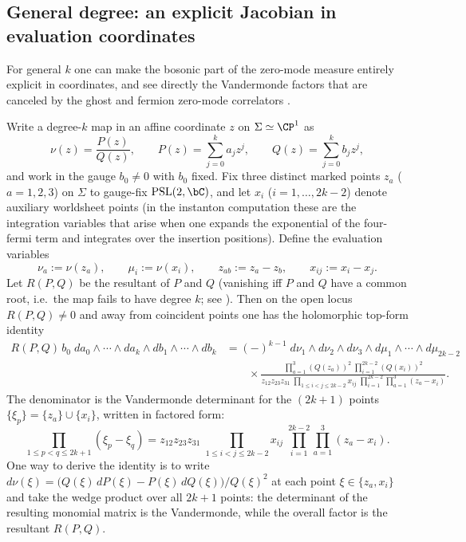 \documentclass[12pt]{article}
\begin{document}
\subsection{General degree: an explicit Jacobian in evaluation coordinates}
For general $k$ one can make the bosonic part of the zero-mode measure entirely
explicit in coordinates, and see directly the Vandermonde factors that are
canceled by the ghost and fermion zero-mode correlators
\cite{AspinwallMorrison:1991tft,Distler:1992n2}.

Write a degree-$k$ map in an affine coordinate $z$ on $\Sigma\simeq\CP^1$ as
\begin{equation*}
  \nu(z)=\frac{P(z)}{Q(z)},\qquad
  P(z)=\sum_{j=0}^k a_j z^j,\qquad
  Q(z)=\sum_{j=0}^k b_j z^j,
\end{equation*}
and work in the gauge $b_0\neq 0$ with $b_0$ fixed. Fix three distinct marked
points $z_a$ ($a=1,2,3$) on $\Sigma$ to gauge-fix $\mathrm{PSL}(2,\bC)$, and let
$x_i$ ($i=1,\dots,2k-2$) denote auxiliary worldsheet points (in the instanton
computation these are the integration variables that arise when one expands the
exponential of the four-fermi term and integrates over the insertion
positions). Define the evaluation variables
\begin{equation*}
  \nu_a:=\nu(z_a),\qquad \mu_i:=\nu(x_i),\qquad
  z_{ab}:=z_a-z_b,\qquad x_{ij}:=x_i-x_j.
\end{equation*}
Let $R(P,Q)$ be the resultant of $P$ and $Q$ (vanishing iff $P$ and $Q$ have a
common root, i.e.\ the map fails to have degree $k$; see
\cite[Eq.~(19.186)]{Yin:FoundationsStringTheory}). Then on the open locus
$R(P,Q)\neq 0$ and away from coincident points one has the holomorphic top-form
identity \cite[Eq.~(19.207)]{Yin:FoundationsStringTheory}
\begin{equation}
  \begin{aligned}
    R(P,Q)\,b_0\; da_0\wedge\cdots\wedge da_k\wedge db_1\wedge\cdots\wedge db_k
    &=
    (-)^{k-1}\; d\nu_1\wedge d\nu_2\wedge d\nu_3\wedge d\mu_1\wedge\cdots\wedge d\mu_{2k-2}\\
    &\qquad\times
    \frac{\prod_{a=1}^3 (Q(z_a))^2\;\prod_{i=1}^{2k-2} (Q(x_i))^2}{
      z_{12}z_{23}z_{31}\;
      \prod_{1\le i<j\le 2k-2} x_{ij}\;
      \prod_{i=1}^{2k-2}\prod_{a=1}^3 (z_a-x_i)}.
  \end{aligned}
  \label{eq:jacobian-general}
\end{equation}
The denominator is the Vandermonde determinant for the $(2k+1)$ points
$\{\xi_p\}=\{z_a\}\cup\{x_i\}$, written in factored form:
\begin{equation*}
  \prod_{1\le p<q\le 2k+1}(\xi_p-\xi_q)
  =
  z_{12}z_{23}z_{31}\;
  \prod_{1\le i<j\le 2k-2} x_{ij}\;
  \prod_{i=1}^{2k-2}\prod_{a=1}^3 (z_a-x_i).
\end{equation*}
One way to derive the identity is to write
$d\nu(\xi)=\big(Q(\xi)\,dP(\xi)-P(\xi)\,dQ(\xi)\big)/Q(\xi)^2$ at each point
$\xi\in\{z_a,x_i\}$ and take the wedge product over all $2k+1$ points: the
determinant of the resulting monomial matrix is the Vandermonde, while the
overall factor is the resultant $R(P,Q)$.
\end{document}
